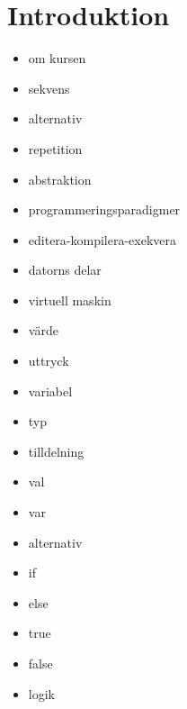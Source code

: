 \chapter{Introduktion}
\begin{itemize}[nosep]
\item om kursen
\item sekvens
\item alternativ
\item repetition
\item abstraktion
\item programmeringsparadigmer
\item editera-kompilera-exekvera
\item datorns delar
\item virtuell maskin
\item värde
\item uttryck
\item variabel
\item typ
\item tilldelning
\item val
\item var
\item alternativ
\item if
\item else
\item true
\item false
\item logik\end{itemize}